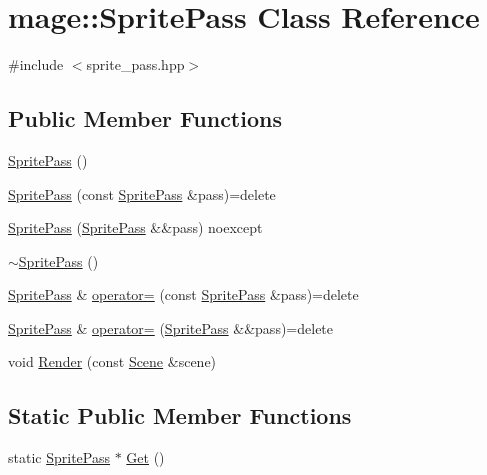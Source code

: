 \hypertarget{classmage_1_1_sprite_pass}{}\section{mage\+:\+:Sprite\+Pass Class Reference}
\label{classmage_1_1_sprite_pass}


{\ttfamily \#include $<$sprite\+\_\+pass.\+hpp$>$}

\subsection*{Public Member Functions}
\begin{DoxyCompactItemize}
\item 
\hyperlink{classmage_1_1_sprite_pass_abe484eb7c99dabc585d874029c85013f}{Sprite\+Pass} ()
\item 
\hyperlink{classmage_1_1_sprite_pass_a84e07e1e8590db93e88697f827a26615}{Sprite\+Pass} (const \hyperlink{classmage_1_1_sprite_pass}{Sprite\+Pass} \&pass)=delete
\item 
\hyperlink{classmage_1_1_sprite_pass_a52cbd066748f6f111924d37e1db22e5e}{Sprite\+Pass} (\hyperlink{classmage_1_1_sprite_pass}{Sprite\+Pass} \&\&pass) noexcept
\item 
\hyperlink{classmage_1_1_sprite_pass_a70a866324750c21196d80364e9a0e309}{$\sim$\+Sprite\+Pass} ()
\item 
\hyperlink{classmage_1_1_sprite_pass}{Sprite\+Pass} \& \hyperlink{classmage_1_1_sprite_pass_af6e85ceefe88d588a1f19814fce4e44f}{operator=} (const \hyperlink{classmage_1_1_sprite_pass}{Sprite\+Pass} \&pass)=delete
\item 
\hyperlink{classmage_1_1_sprite_pass}{Sprite\+Pass} \& \hyperlink{classmage_1_1_sprite_pass_ae5ae1381fd40a8d826e874ec08992060}{operator=} (\hyperlink{classmage_1_1_sprite_pass}{Sprite\+Pass} \&\&pass)=delete
\item 
void \hyperlink{classmage_1_1_sprite_pass_abd345078c9115be82e16871ab86bbfad}{Render} (const \hyperlink{classmage_1_1_scene}{Scene} \&scene)
\end{DoxyCompactItemize}
\subsection*{Static Public Member Functions}
\begin{DoxyCompactItemize}
\item 
static \hyperlink{classmage_1_1_sprite_pass}{Sprite\+Pass} $\ast$ \hyperlink{classmage_1_1_sprite_pass_a0044e0756f5f96f24c188424f9769a02}{Get} ()
\end{DoxyCompactItemize}

